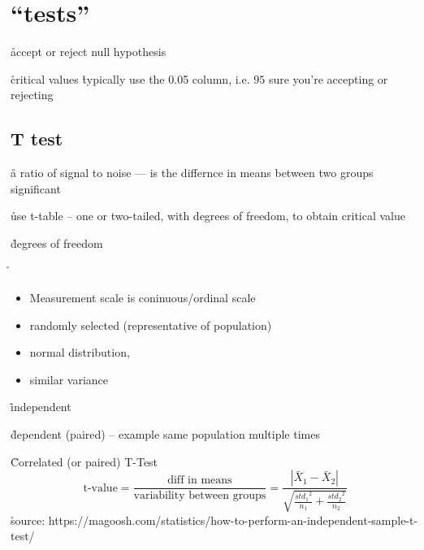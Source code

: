 \section{``tests''}

\r{accept or reject null hypothesis}


\r{critical values \r{typically use the 0.05 column, i.e. $95$ sure you're accepting or rejecting}}

\subsection{T test}



\r{a ratio of signal to noise --- is the differnce in means between two groups significant }

\r{use t-table -- one or two-tailed, with degrees of freedom, to obtain critical value}

\r{degrees of freedom}

\r{\begin{itemize}[noitemsep,topsep=0pt]
		\item Measurement scale is coninuous/ordinal scale
		\item randomly selected (representative of population)
		\item normal distribution,
		\item similar variance
	\end{itemize}
}

\r{independent}

\r{dependent (paired) -- example same population multiple times}


\r{Correlated (or paired) T-Test}
\begin{equation}
	{\textrm{t-value} = \frac{ \textrm{diff in means}}{\textrm{variability between groups}} = \frac{ |\bar{X}_1 - \bar{X}_2|}{ 
			\sqrt{ \frac{ {std_1}^2 }{ n_1 } + \frac{ {std_2}^2 }{ n_2 }}}}
	\label{eq:paired_t_test}
\end{equation}
\r{source: https://magoosh.com/statistics/how-to-perform-an-independent-sample-t-test/}


